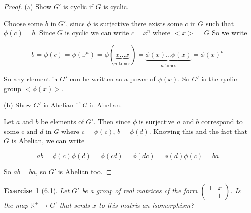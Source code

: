 \documentclass[12pt,leqno]{article}
\numberwithin{equation}{section}
\newtheorem*{exer}{Exercise}
\theoremstyle{definition}
\begin{document}
\begin{proof}[Proof]
\item[(a)] Show $G'$ is cyclic if $G$ is cyclic.

    Choose some $b$ in $G'$, since $\phi$ is surjective there exists some $c$
    in $G$ such that $\phi(c) = b$. Since $G$ is cyclic we can write $c = x^n$
    where $<x> = G$ So we write
    
    $$
    b = \phi(c) = \phi(x^n) = \phi(\underbrace{x \dots x}_{n \text{ times}})
    = \underbrace{\phi(x) \dots \phi(x)}_{n \text{ times}} = \phi(x)^n
    $$

    So any element in $G'$ can be written as a power of $\phi(x)$. So $G'$ is
    the cyclic group $<\phi(x)>$.

\item[(b)] Show $G'$ is Abelian if $G$ is Abelian.

    Let $a$ and $b$ be elements of $G'$. Then since $\phi$ is surjective $a$
    and $b$ correspond to some $c$ and $d$ in $G$ where $a = \phi(c)$, $b =
    \phi(d)$. Knowing this and the fact that $G$ is Abelian, we can write

    $$
    ab = \phi(c) \phi(d) = \phi(cd) = \phi(dc) = \phi(d) \phi(c) = ba
    $$

    So $ab = ba$, so $G'$ is Abelian too.

\end{proof}

\begin{exer}[6.1]
Let $G'$ be a group of real matrices of the form $\left (  \begin{array}{cc}
 1 & x \\ 
   & 1 \end{array} \right )$. Is the map $\mathbb R^+ \rightarrow G'$ that sends $x$ to this  matrix an isomorphism?
\end{exer}
\end{document}

